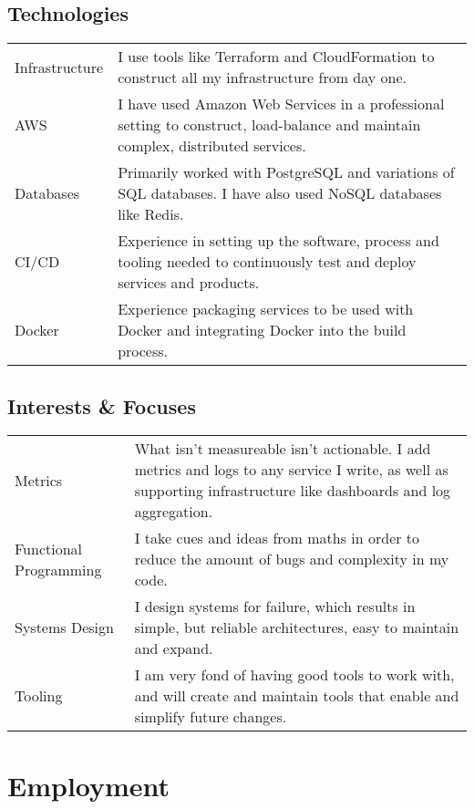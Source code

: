 \documentclass[a4paper]{article}
\begin{document}
\subsection*{Technologies}
\begin{tabular}{ p{3cm} | p{13cm} }
Infrastructure & I use tools like Terraform and CloudFormation to
construct all my infrastructure from day one. \\
AWS & I have used Amazon Web Services in a professional setting to construct, load-balance and
maintain complex, distributed services. \\
Databases & Primarily worked with PostgreSQL and variations of SQL
databases. I have also used NoSQL databases like Redis. \\
CI/CD & Experience in setting up the software, process and tooling needed
to continuously test and deploy services and products.\\
Docker & Experience packaging services to be used with Docker and
integrating Docker into the build process.
\end{tabular}

\subsection*{Interests \& Focuses}
\begin{tabular}{ p{3cm} | p{13cm} }
  Metrics & What isn't measureable isn't actionable. I add metrics and logs to
any service I write, as well as supporting infrastructure like dashboards and
log aggregation. \\
Functional \linebreak Programming & I take cues and ideas from maths in order to reduce the
amount of bugs and complexity in my code.\\
Systems Design & I design systems for failure, which results in simple,
but reliable architectures, easy to maintain and expand.\\
Tooling & I am very fond of having good tools to work with, and will create and
maintain tools that enable and simplify future changes. \\
\end{tabular}

\section*{Employment}
\end{document}
